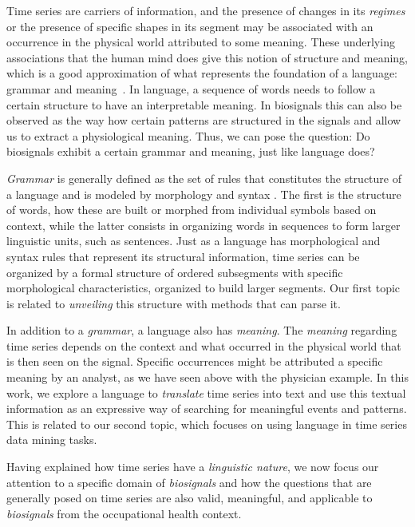 Time series are carriers of information, and the presence of changes in its \textit{regimes} or the presence of specific shapes in its segment may be associated with an occurrence in the physical world attributed to some meaning. These underlying associations that the human mind does give this notion of structure and meaning, which is a good approximation of what represents the foundation of a language: grammar and meaning~\cite{grammar}. In language, a sequence of words needs to follow a certain structure to have an interpretable meaning. In biosignals this can also be observed as the way how certain patterns are structured in the signals and allow us to extract a physiological meaning. Thus, we can pose the question: Do biosignals exhibit a certain grammar and meaning, just like language does?

\textit{Grammar} is generally defined as the set of rules that constitutes the structure of a language and is modeled by morphology and syntax \cite{grammar}. The first is the structure of words, how these are built or morphed from individual symbols based on context, while the latter consists in organizing words in sequences to form larger linguistic units, such as sentences. Just as a language has morphological and syntax rules that represent its structural information, time series can be organized by a formal structure of ordered subsegments with specific morphological characteristics, organized to build larger segments. Our first topic is related to \textit{unveiling} this structure with methods that can parse it.

In addition to a \textit{grammar}, a language also has \textit{meaning}. The \textit{meaning} regarding time series depends on the context and what occurred in the physical world that is then seen on the signal. Specific occurrences might be attributed a specific meaning by an analyst, as we have seen above with the physician example. In this work, we explore a language to \textit{translate} time series into text and use this textual information as an expressive way of searching for meaningful events and patterns. This is related to our second topic, which focuses on using language in time series data mining tasks.

Having explained how time series have a \textit{linguistic nature}, we now focus our attention to a specific domain of \textit{biosignals} and how the questions that are generally posed on time series are also valid, meaningful, and applicable to \textit{biosignals} from the occupational health context.

